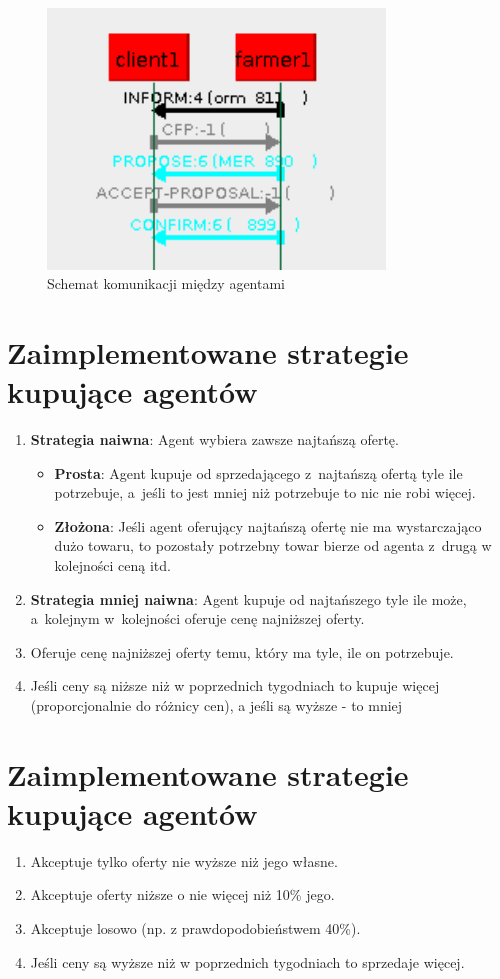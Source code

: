 \documentclass[12pt]{article}
\begin{document}
\begin{figure} [H]
 \centering
 \includegraphics[width=0.8\textwidth]{obrazki/komunikacja_2_agentow-accept}
 \caption{Schemat komunikacji między agentami}
 \label{fig:schemat komunikacji}
\end{figure}

\section{Zaimplementowane strategie kupujące agentów}
\begin{enumerate}
 \item \textbf{Strategia naiwna}: Agent wybiera zawsze najtańszą ofertę.
  \begin{itemize}
  \item \textbf{Prosta}: Agent kupuje od sprzedającego z~najtańszą ofertą tyle ile potrzebuje, a~jeśli to jest mniej niż potrzebuje to nic nie robi więcej.
  \item \textbf{Złożona}: Jeśli agent oferujący najtańszą ofertę nie ma wystarczająco dużo towaru, to pozostały potrzebny towar bierze od agenta z~drugą w kolejności ceną itd.
  \end{itemize}
 \item \textbf{Strategia mniej naiwna}: Agent kupuje od najtańszego tyle ile może, a~kolejnym w~kolejności oferuje cenę najniższej oferty.
 \item Oferuje cenę najniższej oferty temu, który ma tyle, ile on potrzebuje.
 \item Jeśli ceny są niższe niż w poprzednich tygodniach to kupuje więcej (proporcjonalnie do różnicy cen), a jeśli są wyższe - to mniej
\end{enumerate}

\section{Zaimplementowane strategie kupujące agentów}
\begin{enumerate}
 \item Akceptuje tylko oferty nie wyższe niż jego własne.
 \item Akceptuje oferty niższe o nie więcej niż 10\% jego.
 \item Akceptuje losowo (np. z prawdopodobieństwem 40\%).
 \item Jeśli ceny są wyższe niż w poprzednich tygodniach to sprzedaje więcej.
\end{enumerate}
\end{document}
